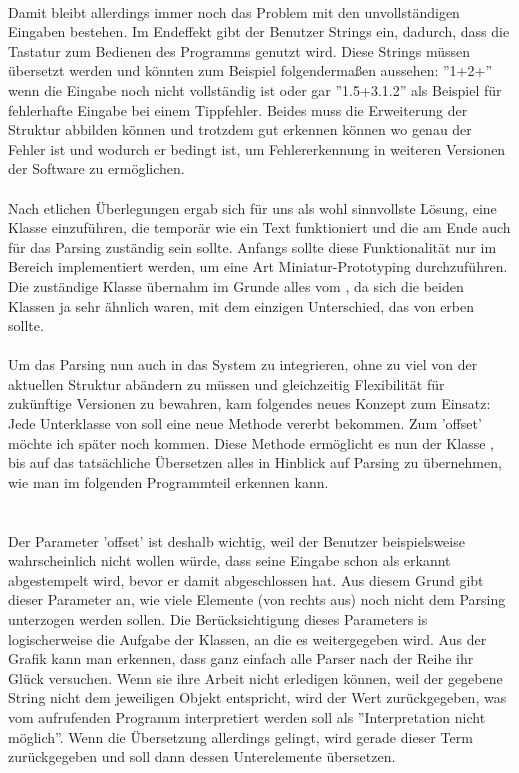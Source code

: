 \ \\
Damit bleibt allerdings immer noch das Problem mit den unvollständigen Eingaben bestehen. Im Endeffekt gibt der Benutzer Strings ein, dadurch, dass die Tastatur zum Bedienen des Programms genutzt wird. Diese Strings müssen übersetzt werden und könnten zum Beispiel folgendermaßen aussehen: ''1+2+'' wenn die Eingabe noch nicht vollständig ist oder gar ''1.5+3.1.2'' als Beispiel für fehlerhafte Eingabe bei einem Tippfehler. Beides muss die Erweiterung der Struktur abbilden können und trotzdem gut erkennen können wo genau der Fehler ist und wodurch er bedingt ist, um Fehlererkennung in weiteren Versionen der Software zu ermöglichen.\\
\\
Nach etlichen Überlegungen ergab sich für uns als wohl sinnvollste Lösung, eine Klasse einzuführen, die temporär wie ein Text funktioniert und die am Ende auch für das Parsing zuständig sein sollte. Anfangs sollte diese Funktionalität nur im Bereich  implementiert werden, um eine Art Miniatur-Prototyping durchzuführen. Die zuständige Klasse  übernahm im Grunde alles vom , da sich die beiden Klassen ja sehr ähnlich waren, mit dem einzigen Unterschied, das  von  erben sollte.\\
\\
Um das Parsing nun auch in das System zu integrieren, ohne zu viel von der aktuellen Struktur abändern zu müssen und gleichzeitig Flexibilität für zukünftige Versionen zu bewahren, kam folgendes neues Konzept zum Einsatz: Jede Unterklasse von  soll eine neue Methode  vererbt bekommen. Zum 'offset' möchte ich später noch kommen. Diese Methode ermöglicht es nun der Klasse , bis auf das tatsächliche Übersetzen alles in Hinblick auf Parsing zu übernehmen, wie man im folgenden Programmteil erkennen kann.\\
\\
\ \\
Der Parameter 'offset' ist deshalb wichtig, weil der Benutzer beispielsweise wahrscheinlich nicht wollen würde, dass seine Eingabe schon als erkannt abgestempelt wird, bevor er damit abgeschlossen hat. Aus diesem Grund gibt dieser Parameter an, wie viele Elemente (von rechts aus) noch nicht dem Parsing unterzogen werden sollen. Die Berücksichtigung dieses Parameters is logischerweise die Aufgabe der Klassen, an die es weitergegeben wird. Aus der Grafik kann man erkennen, dass ganz einfach alle Parser nach der Reihe ihr Glück versuchen. Wenn sie ihre Arbeit nicht erledigen können, weil der gegebene String nicht dem jeweiligen Objekt entspricht, wird der Wert  zurückgegeben, was vom aufrufenden Programm interpretiert werden soll als ''Interpretation nicht möglich''. Wenn die Übersetzung allerdings gelingt, wird gerade dieser Term zurückgegeben und soll dann dessen Unterelemente übersetzen.\\
